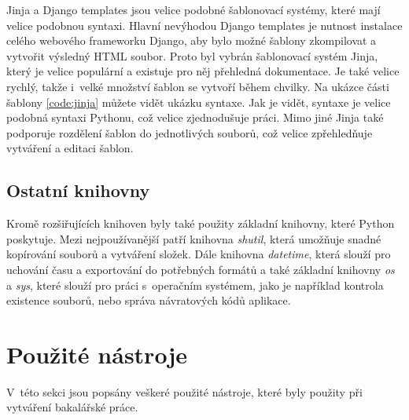 \documentclass[thesis=B,czech]{resources/FITthesis}[2012/06/26]
\begin{document}
Jinja a Django templates jsou velice podobné šablonovací systémy, které mají velice podobnou syntaxi. Hlavní nevýhodou Django templates je nutnost instalace celého webového frameworku Django, aby bylo možné šablony zkompilovat a vytvořit výsledný HTML soubor. Proto byl vybrán šablonovací systém Jinja, který je velice populární a existuje pro něj přehledná dokumentace. Je také velice rychlý, takže i~velké množství šablon se vytvoří během chvilky. Na ukázce části šablony \ref{code:jinja} můžete vidět ukázku syntaxe. Jak je vidět, syntaxe je velice podobná syntaxi Pythonu, což velice zjednodušuje práci. Mimo jiné Jinja také podporuje rozdělení šablon do jednotlivých souborů, což velice zpřehledňuje vytváření a editaci šablon.

\subsection{Ostatní knihovny}
Kromě rozšiřujících knihoven byly také použity základní knihovny, které Python poskytuje. Mezi nejpoužívanější patří knihovna \textit{shutil}, která umožňuje snadné kopírování souborů a vytváření složek. Dále knihovna \textit{datetime}, která slouží pro uchování času a exportování do potřebných formátů a také základní knihovny \textit{os} a \textit{sys}, které slouží pro práci s~operačním systémem, jako je například kontrola existence souborů, nebo správa návratových kódů aplikace.



\section{Použité nástroje}
V~této sekci jsou popsány veškeré použité nástroje, které byly použity při vytváření bakalářské práce.
\end{document}

